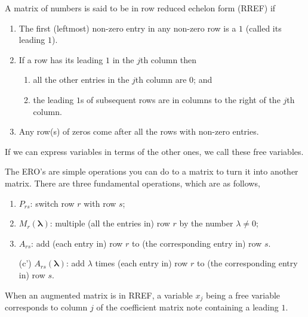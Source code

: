 \documentclass[10pt, a4paper]{article}
\begin{document}
\begin{definition}
    A matrix of numbers is said to be in row reduced echelon form (RREF) if
    \begin{enumerate}[label = (\roman*)]
        \item The first (leftmost) non-zero entry in any non-zero row is a $1$ (called its leading $1$).
        \item If a row has its leading $1$ in the $j$th column then
        \begin{enumerate}[label = (\alph*)]
            \item all the other entries in the $j$th column are $0$; and
            \item the leading $1$s of subsequent rows are in columns to the right of the $j$th column.
        \end{enumerate}
    \item Any row(s) of zeros come after all the rows with non-zero entries.
    \end{enumerate}
\end{definition}

\begin{remark}
    If we can express variables in terms of the other ones,
    we call these free variables.
\end{remark}

\begin{remark}
    The ERO's are simple operations you can do to a matrix to turn it into another matrix.
    There are three fundamental operations, which are as follows,
    \begin{enumerate}[label = (\alph*)]
        \item $P_{rs}$: switch row $r$ with row $s$;
        \item $M_{r}(\pmb{\lambda})$: multiple (all the entries in) row $r$ by the number $\lambda \neq 0$;
        \item $A_{rs}$: add (each entry in) row $r$ to (the corresponding entry in) row $s$.
        \item[(c')] $A_{rs}(\pmb{\lambda})$: add $\lambda$ times (each entry in) row $r$ to (the corresponding entry in) row $s$.
    \end{enumerate}
\end{remark}

\begin{remark}
    When an augmented matrix is in RREF,
    a variable $x_j$ being a free variable corresponds to column $j$ of the coefficient matrix note containing a leading $1$.
\end{remark}
\end{document}
